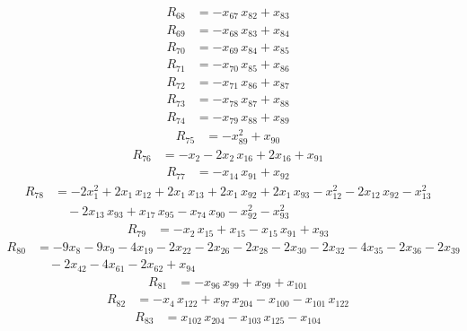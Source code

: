 \begin{align*}
R_{68} &= -x_{67}\,x_{82} +x_{83}
\end{align*}
\begin{align*}
R_{69} &= -x_{68}\,x_{83} +x_{84}
\end{align*}
\begin{align*}
R_{70} &= -x_{69}\,x_{84} +x_{85}
\end{align*}
\begin{align*}
R_{71} &= -x_{70}\,x_{85} +x_{86}
\end{align*}
\begin{align*}
R_{72} &= -x_{71}\,x_{86} +x_{87}
\end{align*}
\begin{align*}
R_{73} &= -x_{78}\,x_{87} +x_{88}
\end{align*}
\begin{align*}
R_{74} &= -x_{79}\,x_{88} +x_{89}
\end{align*}
\begin{align*}
R_{75} &= -x_{89}^{2} +x_{90}
\end{align*}
\begin{align*}
R_{76} &= -x_{2} -2x_{2}\,x_{16} +2x_{16} +x_{91}
\end{align*}
\begin{align*}
R_{77} &= -x_{14}\,x_{91} +x_{92}
\end{align*}
\begin{align*}
R_{78} &= -2x_{1}^{2} +2x_{1}\,x_{12} +2x_{1}\,x_{13} +2x_{1}\,x_{92} +2x_{1}\,x_{93} -x_{12}^{2} -2x_{12}\,x_{92} -x_{13}^{2} \\
&\quad {} -2x_{13}\,x_{93} +x_{17}\,x_{95} -x_{74}\,x_{90} -x_{92}^{2} -x_{93}^{2}
\end{align*}
\begin{align*}
R_{79} &= -x_{2}\,x_{15} +x_{15} -x_{15}\,x_{91} +x_{93}
\end{align*}
\begin{align*}
R_{80} &= -9x_{8} -9x_{9} -4x_{19} -2x_{22} -2x_{26} -2x_{28} -2x_{30} -2x_{32} -4x_{35} -2x_{36} -2x_{39} \\
&\quad {} -2x_{42} -4x_{61} -2x_{62} +x_{94}
\end{align*}
\begin{align*}
R_{81} &= -x_{96}\,x_{99} +x_{99} +x_{101}
\end{align*}
\begin{align*}
R_{82} &= -x_{4}\,x_{122} +x_{97}\,x_{204} -x_{100} -x_{101}\,x_{122}
\end{align*}
\begin{align*}
R_{83} &= x_{102}\,x_{204} -x_{103}\,x_{125} -x_{104}
\end{align*}
